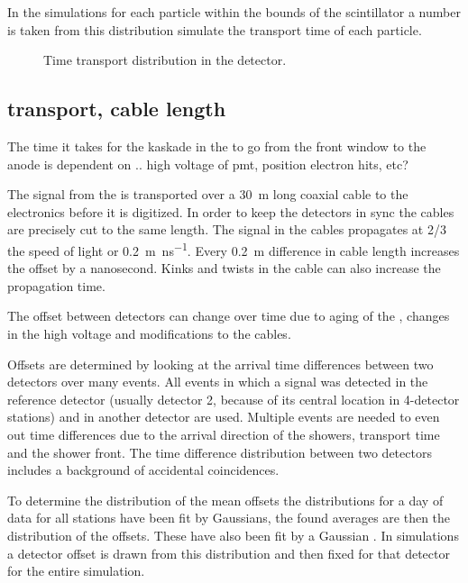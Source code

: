 In the simulations for each particle within the bounds of the
scintillator a number is taken from this distribution simulate the
transport time of each particle.

\begin{figure}
    \centering
    
    \caption{ Time transport
             distribution in the detector.}
    \label{fig:transport_time}
\end{figure}


\subsection{\pmt transport, cable length}

The time it takes for the kaskade in the \pmt to go from the front
window to the anode is dependent on .. high voltage of pmt, position
electron hits, etc?

The signal from the \pmt is transported over a \SI{30}{\meter} long
coaxial cable to the \hisparc electronics before it is digitized. In
order to keep the detectors in sync the cables are precisely cut to the
same length. The signal in the cables propagates at 2/3 the speed of
light or \SI{.2}{\meter\per\nano\second}. Every \SI{.2}{\meter}
difference in cable length increases the offset by a nanosecond. Kinks
and twists in the cable can also increase the propagation time.

The offset between detectors can change over time due to aging of the
\pmt, changes in the high voltage and modifications to the cables.

Offsets are determined by looking at the arrival time differences
between two detectors over many events. All events in which a signal was
detected in the reference detector (usually detector 2, because of its
central location in 4-detector stations) and in another detector are
used. Multiple events are needed to even out time differences due to the
arrival direction of the showers, transport time and the shower front.
The time difference distribution between two detectors includes a
background of accidental coincidences.

To determine the distribution of the mean offsets the distributions for
a day of data for all stations have been fit by Gaussians, the found
averages are then the distribution of the offsets. These have also been
fit by a Gaussian . In
simulations a detector offset is drawn from this distribution and then
fixed for that detector for the entire simulation.


